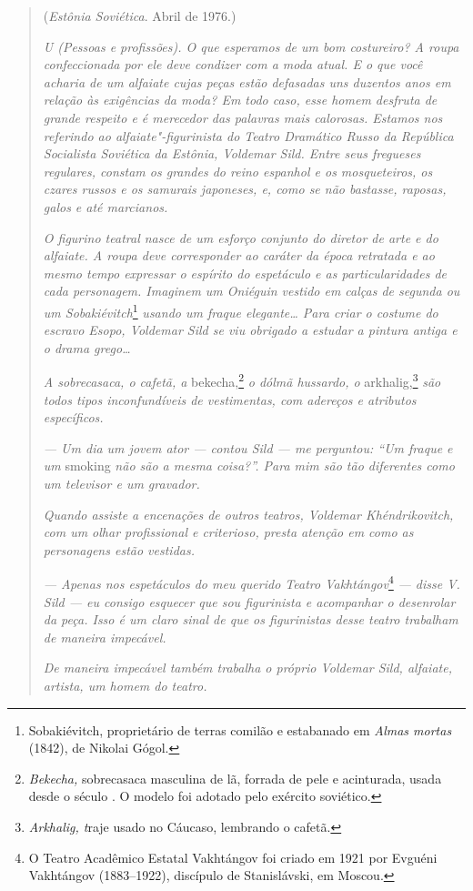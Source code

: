 \begin{quotation}
\begin{flushright}
(\emph{Estônia Soviética}. Abril de 1976.)
\end{flushright}
\vspace{4pt}
\noindent\emph{U (Pessoas e profissões). O que esperamos
de um bom costureiro? A roupa confeccionada por ele deve condizer com a
moda atual. E o que você acharia de um alfaiate cujas peças estão
defasadas uns duzentos anos em relação às exigências da moda? Em todo
caso, esse homem desfruta de grande respeito e é merecedor das palavras
mais calorosas. Estamos nos referindo ao alfaiate"-figurinista do Teatro
Dramático Russo da República Socialista Soviética da Estônia, Voldemar
Sild. Entre seus fregueses regulares, constam os grandes do reino
espanhol e os mosqueteiros, os czares russos e os samurais japoneses, e,
como se não bastasse, raposas, galos e até marcianos.}

\emph{O figurino teatral nasce de um esforço conjunto do diretor de arte
e do alfaiate. A roupa deve corresponder ao caráter da época retratada e
ao mesmo tempo expressar o espírito do espetáculo e as particularidades
de cada personagem. Imaginem um Oniéguin vestido em calças de segunda ou
um Sobakiévitch}\footnote{Sobakiévitch, proprietário de terras comilão e
  estabanado em \emph{Almas mortas} (1842), de Nikolai Gógol.}
\emph{usando um fraque elegante\ldots{} Para criar o costume do escravo
Esopo, Voldemar Sild se viu obrigado a estudar a pintura antiga e o
drama grego\ldots{}}

\emph{A sobrecasaca, o cafetã, a} bekecha,\footnote{\emph{Bekecha,}
  sobrecasaca masculina de lã, forrada de pele e acinturada, usada desde
  o século . O modelo foi adotado pelo exército soviético.} \emph{o
dólmã hussardo, o} arkhalig,\footnote{\emph{Arkhalig, t}raje
  usado no Cáucaso, lembrando o cafetã.} \emph{são todos tipos
inconfundíveis de vestimentas, com adereços e atributos específicos.}

\emph{--- Um dia um jovem ator --- contou Sild --- me perguntou: ``Um
fraque e um} smoking \emph{não são a mesma coisa?''. Para mim são tão
diferentes como um televisor e um gravador.}

\emph{Quando assiste a encenações de outros teatros, Voldemar
Khéndrikovitch, com um olhar profissional e criterioso, presta atenção
em como as personagens estão vestidas.}

\emph{--- Apenas nos espetáculos do meu querido Teatro
Vakhtángov}\footnote{O Teatro Acadêmico Estatal Vakhtángov foi criado em
  1921 por Evguéni Vakhtángov (1883--1922), discípulo de Stanislávski,
  em Moscou.} \emph{--- disse V. Sild --- eu consigo esquecer que sou
figurinista e acompanhar o desenrolar da peça. Isso é um claro sinal de
que os figurinistas desse teatro trabalham de maneira impecável.}

\emph{De maneira impecável também trabalha o próprio Voldemar Sild,
alfaiate, artista, um homem do teatro.}
\end{quotation}

